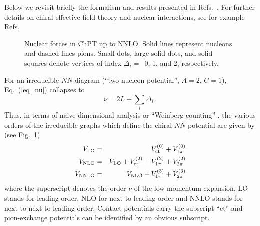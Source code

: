 Below we revisit briefly the formalism and results presented in
Refs.~\cite{ekstromPRX}. For further details on chiral effective
field theory and nuclear interactions, see for example
Refs.~\cite{machleidt2011,epelbaum2009,ekstrom2013}
\begin{figure}[t]\centering
\caption{Nuclear forces in ChPT up to NNLO. Solid lines represent
  nucleons and dashed lines pions.  Small dots, large solid dots, and
  solid squares denote vertices of index $\Delta_i= \, $ 0, 1, and 2,
  respectively.}
\label{fig_diagNNLO}
\end{figure}
For an irreducible $NN$ diagram (``two-nucleon potential'', $A=2$,
$C=1$), Eq.~(\ref{eq_nu}) collapses to
\begin{equation} 
\nu = 2L + \sum_i \Delta_i \, .
\label{eq_nunn} 
\end{equation}
Thus, in terms of naive dimensional analysis or ``Weinberg counting''
\cite{weinberg1990}, the various orders of the
irreducible graphs which define the chiral $NN$ potential are given by
(see Fig.~\ref{fig_diagNNLO})
\begin{eqnarray}
V_{\rm LO} & = & V_{\rm ct}^{(0)} + V_{1\pi}^{(0)}
\label{eq_VLO}
\\ V_{\rm NLO} & = & V_{\rm LO} + V_{\rm ct}^{(2)} + V_{1\pi}^{(2)} +
V_{2\pi}^{(2)}
\label{eq_VNLO}
\\ V_{\rm NNLO} & = & V_{\rm NLO} + V_{1\pi}^{(3)} + V_{2\pi}^{(3)}
\label{eq_VNNLO}
\end{eqnarray}
where the superscript denotes the order $\nu$ of the low-momentum
expansion, LO stands for leading order, NLO for next-to-leading order
and NNLO stands for next-to-next-to leading order.  Contact potentials
carry the subscript ``ct'' and pion-exchange potentials can be
identified by an obvious subscript.

